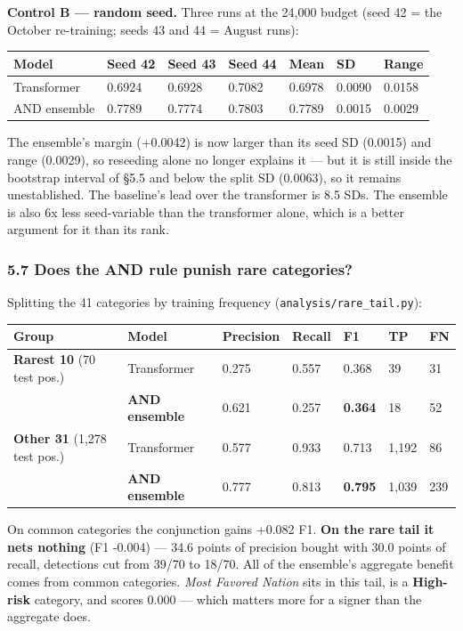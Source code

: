 \documentclass[
  10pt,
]{article}
\begin{document}
\textbf{Control B --- random seed.} Three runs at the 24,000 budget (seed 42 =
the October re-training; seeds 43 and 44 = August runs):

\begin{longtable}[]{@{}lllllll@{}}
\toprule
Model & Seed 42 & Seed 43 & Seed 44 & Mean & SD & Range \\
\midrule
\endhead
Transformer & 0.6924 & 0.6928 & 0.7082 & 0.6978 & 0.0090 & 0.0158 \\
AND ensemble & 0.7789 & 0.7774 & 0.7803 & 0.7789 & 0.0015 & 0.0029 \\
\bottomrule
\end{longtable}

The ensemble's margin (+0.0042) is now larger than its seed SD (0.0015) and
range (0.0029), so reseeding alone no longer explains it --- but it is still
inside the bootstrap interval of §5.5 and below the split SD (0.0063), so it
remains unestablished. The baseline's lead over the transformer is 8.5 SDs. The
ensemble is also 6x less seed-variable than the transformer alone, which is a
better argument for it than its rank.

\subsubsection{5.7 Does the AND rule punish rare categories?}

Splitting the 41 categories by training frequency
(\texttt{analysis/rare\_tail.py}):

\begin{longtable}[]{@{}lllllll@{}}
\toprule
Group & Model & Precision & Recall & F1 & TP & FN \\
\midrule
\endhead
\textbf{Rarest 10} (70 test pos.) & Transformer & 0.275 & 0.557 & 0.368 & 39 &
31 \\
& \textbf{AND ensemble} & 0.621 & 0.257 & \textbf{0.364} & 18 & 52 \\
\textbf{Other 31} (1,278 test pos.) & Transformer & 0.577 & 0.933 & 0.713 &
1,192 & 86 \\
& \textbf{AND ensemble} & 0.777 & 0.813 & \textbf{0.795} & 1,039 & 239 \\
\bottomrule
\end{longtable}

On common categories the conjunction gains +0.082 F1. \textbf{On the rare tail
it nets nothing} (F1 -0.004) --- 34.6 points of precision bought with 30.0
points of recall, detections cut from 39/70 to 18/70. All of the ensemble's
aggregate benefit comes from common categories. \emph{Most Favored Nation} sits
in this tail, is a \textbf{High-risk} category, and scores 0.000 --- which
matters more for a signer than the aggregate does.
\end{document}
